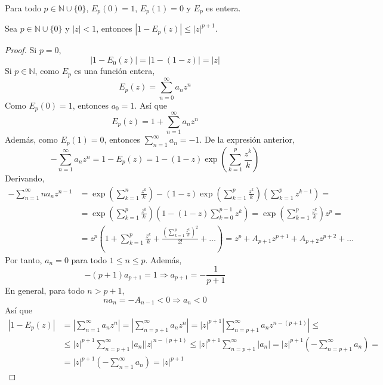 \begin{remark}
    Para todo $p \in \mathbb{N} \cup \{0\}$, $E_p(0) = 1$, $E_p(1) = 0$ y $E_p$ es entera.
\end{remark}

\begin{lemma}
    Sea $p \in \mathbb{N} \cup \{0\}$ y $|z| < 1$, entonces $|1-E_p(z)| \leq |z|^{p+1}$.
\end{lemma}

\begin{proof}
    Si $p = 0$,
    $$|1-E_0(z)| = |1-(1-z)| = |z|$$
    Si $p \in \mathbb{N}$, como $E_p$ es una función entera,
    $$E_p(z) = \sum_{n=0}^\infty a_nz^n$$
    Como $E_p(0) = 1$, entonces $a_0 = 1$.
    Así que
    $$E_p(z) = 1 + \sum_{n=1}^\infty a_nz^n$$
    Además, como $E_p(1) = 0$, entonces $\sum_{n=1}^\infty a_n = -1$.
    De la expresión anterior,
    $$-\sum_{n=1}^\infty a_nz^n = 1-E_p(z) = 1-(1-z)\exp\left(\sum_{k=1}^p \frac{z^k}{k}\right)$$
    Derivando,
    \begin{align*}
        -\sum_{n=1}^\infty na_nz^{n-1} & = \exp\left(\sum_{k=1}^n \frac{z^k}{k}\right) - (1-z)\exp\left(\sum_{k=1}^p \frac{z^k}{k}\right)\left(\sum_{k=1}^p z^{k-1}\right) =                             \\
                                       & =\exp\left(\sum_{k=1}^p \frac{z^k}{k}\right)\left(1-(1-z)\sum_{k=0}^{p-1} z^k\right) = \exp\left(\sum_{k=1}^p \frac{z^k}{k}\right)z^p =                         \\
                                       & = z^p\left(1 + \sum_{k=1}^p \frac{z^k}{k} + \frac{\left(\sum_{k=1}^p \frac{z^k}{k}\right)^2}{2!} + \dots\right) = z^p + A_{p+1}z^{p+1} + A_{p+2}z^{p+2} + \dots
    \end{align*}
    Por tanto, $a_n = 0$ para todo $1 \leq n \leq p$.
    Además,
    $$-(p+1)a_{p+1} = 1 \Rightarrow a_{p+1} = -\frac{1}{p+1}$$
    En general, para todo $n > p+1$,
    $$na_n = -A_{n-1} < 0 \Rightarrow a_n < 0$$
    Así que
    \begin{align*}
        |1-E_p(z)| & = \left|\sum_{n=1}^\infty a_nz^n\right| = \left|\sum_{n=p+1}^\infty a_nz^n\right| = |z|^{p+1}\left|\sum_{n=p+1}^\infty a_nz^{n-(p+1)}\right| \leq \\
                   & \leq |z|^{p+1} \sum_{n=p+1}^\infty |a_n||z|^{n-(p+1)} \leq |z|^{p+1} \sum_{n=p+1}^\infty |a_n| = |z|^{p+1}\left(-\sum_{n=p+1}^\infty a_n\right) = \\
                   & = |z|^{p+1} \left(-\sum_{n=1}^\infty a_n\right) = |z|^{p+1}
    \end{align*}
\end{proof}

